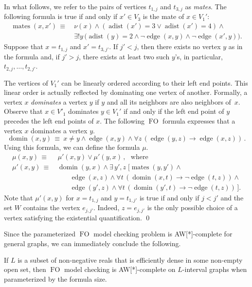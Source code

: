 \documentclass{CSML}
\def\prebox#1{\mathop{\mbox{#1}}}
\newcommand{\FO}{\ensuremath{\operatorname{FO}}\xspace}
\theoremstyle{plain}\newtheorem{claim}[thm]{Claim}
\begin{document}
In what follows, we refer to the pairs of vertices $t_{1,j}$ and $t_{3,j}$ as \emph{mates}.
The following formula is true if and only if $x'\in V_3$ is the mate of $x\in V_1'$:
\begin{align*}
\prebox{mates}(x,x')\,\equiv~&
 \nu(x)\wedge(\prebox{adist}(x')=3\lor\prebox{adist}(x')=4)\wedge
\\
	&\exists!y\, \big( \prebox{adist}(y)=2\wedge
		\neg\prebox{edge}(x,y)\wedge\neg\prebox{edge}(x',y)
	\big).
\end{align*}
Suppose that $x=t_{1,j}$ and $x'=t_{3,j'}$.
If $j'<j$, then there exists no vertex $y$ as in the formula and,
if $j'>j$, there exists at least two such $y$'s, in particular, $t_{2,j},\dots,t_{2,j'}$.

The vertices of $V_1'$ can be linearly ordered according to their left end points.
This linear order is actually reflected by dominating one vertex of another.
Formally, a vertex $x$ {\em dominates} a vertex $y$ if $y$ and all its neighbors are also neighbors of~$x$.
Observe that $x\in V'_1$ dominates $y\in V_1'$ if and only if the left end point of $y$ precedes the left end points of $x$.
The following \FO formula expresses that a vertex $x$ dominates a vertex $y$.
$$\prebox{domin}(x,y)\,\equiv\> x\not=y\wedge\prebox{edge}(x,y)\wedge \forall z\,(\prebox{edge}(y,z)\to\prebox{edge}(x,z))\,.$$
Using this formula, we can define the formula $\mu$.
\begin{align*}
\mu(x,y)\,\equiv&\> \mu'(x,y)\vee\mu'(y,x) \,,
\mbox{~~where}\\
\mu'(x,y)\,\equiv&\, \prebox{domin}(y,x)\wedge 
	\exists\, y',z\;\big[ \prebox{mates}(y,y')\wedge
\\
&\qquad\prebox{edge}(x,z)\wedge\forall
		t\,(\prebox{domin}(x,t)\to\neg\prebox{edge}(t,z)) \wedge
\\
&\qquad\prebox{edge}(y',z)\wedge\forall
		t\,(\prebox{domin}(y',t)\to\neg\prebox{edge}(t,z)) \,
\big].
\end{align*}
Note that $\mu'(x,y)$ for $x=t_{1,j}$ and $y=t_{1,j'}$ is true if and only if $j<j'$ and the set $W$ contains the vertex $e_{j,j'}$.
Indeed, $z=e_{j,j'}$ is the only possible choice of a vertex satisfying the existential quantification.
\qed

Since the parameterized \FO model checking problem is AW[*]-complete
for general graphs, we can immediately conclude the following.
\begin{cor}
\label{cor-FO}
If $L$ is a subset of non-negative reals that is efficiently dense in some non-empty open set,
then \FO model checking is AW[*]-complete on $L$-interval graphs when
parameterized by the formula size.
\end{cor}
\end{document}
